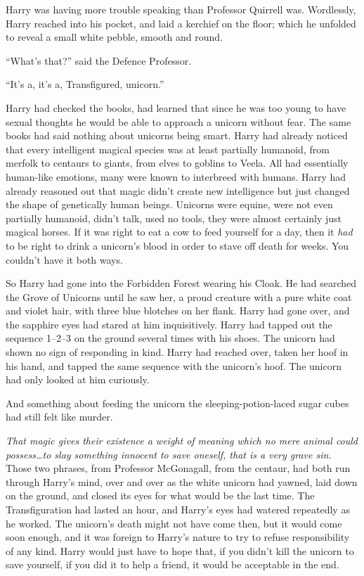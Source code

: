 Harry was having more trouble speaking than Professor Quirrell was. Wordlessly, Harry reached into his pocket, and laid a kerchief on the floor; which he unfolded to reveal a small white pebble, smooth and round.

“What’s that?” said the Defence Professor.

“It’s a, it’s a, Transfigured, unicorn.”

Harry had checked the books, had learned that since he was too young to have sexual thoughts he would be able to approach a unicorn without fear. The same books had said nothing about unicorns being smart. Harry had already noticed that every intelligent magical species was at least partially humanoid, from merfolk to centaurs to giants, from elves to goblins to Veela. All had essentially human-like emotions, many were known to interbreed with humans. Harry had already reasoned out that magic didn’t create new intelligence but just changed the shape of genetically human beings. Unicorns were equine, were not even partially humanoid, didn’t talk, used no tools, they were almost certainly just magical horses. If it was right to eat a cow to feed yourself for a day, then it \emph{had} to be right to drink a unicorn’s blood in order to stave off death for weeks. You couldn’t have it both ways.

So Harry had gone into the Forbidden Forest wearing his Cloak. He had searched the Grove of Unicorns until he saw her, a proud creature with a pure white coat and violet hair, with three blue blotches on her flank. Harry had gone over, and the sapphire eyes had stared at him inquisitively. Harry had tapped out the sequence 1–2–3 on the ground several times with his shoes. The unicorn had shown no sign of responding in kind. Harry had reached over, taken her hoof in his hand, and tapped the same sequence with the unicorn’s hoof. The unicorn had only looked at him curiously.

And something about feeding the unicorn the sleeping-potion-laced sugar cubes had still felt like murder.

\emph{That magic gives their existence a weight of meaning which no mere animal could possess…to slay something innocent to save oneself, that is a very grave sin.} Those two phrases, from Professor McGonagall, from the centaur, had both run through Harry’s mind, over and over as the white unicorn had yawned, laid down on the ground, and closed its eyes for what would be the last time. The Transfiguration had lasted an hour, and Harry’s eyes had watered repeatedly as he worked. The unicorn’s death might not have come then, but it would come soon enough, and it was foreign to Harry’s nature to try to refuse responsibility of any kind. Harry would just have to hope that, if you didn’t kill the unicorn to save yourself, if you did it to help a friend, it would be acceptable in the end.

